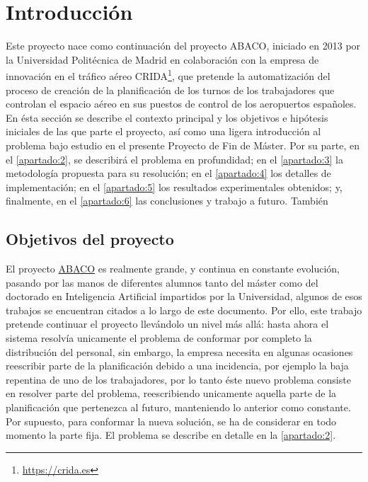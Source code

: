 \graphicspath{{capitulos/Capitulo1-Introduccion/recursos/}}


\section{Introducción}

Este proyecto nace como continuación del proyecto ABACO, iniciado en 2013 por la Universidad Politécnica de Madrid en
colaboración con la empresa de innovación en el tráfico aéreo CRIDA\footnote{\url{https://crida.es}}, que pretende la
automatización del proceso de creación de la planificación de los turnos de los trabajadores que controlan el espacio 
aéreo en sus puestos de control de los aeropuertos españoles.
\\

En ésta sección se describe el contexto principal y los objetivos e hipótesis iniciales de las que parte el proyecto, 
así como una ligera introducción al problema bajo estudio en el presente Proyecto de Fin de Máster. Por su parte, en el 
\autoref{apartado:2}, se describirá el problema en profundidad; en el \autoref{apartado:3}
la metodología propuesta para su resolución; en el \autoref{apartado:4} los detalles de implementación;
en el \autoref{apartado:5} los resultados experimentales obtenidos; y, finalmente, en el \autoref{apartado:6} las 
conclusiones y trabajo a futuro. También  %

\subsection{Objetivos del proyecto}
\label{sec:Objectivos}
El proyecto \hyperref[ABACO]{ABACO} es realmente grande, y continua en constante evolución, pasando por las manos de 
diferentes alumnos
tanto del máster como del doctorado en Inteligencia Artificial impartidos por la Universidad, algunos de esos trabajos 
se encuentran citados a lo largo de este documento. 
Por ello, este trabajo pretende continuar el proyecto llevándolo un nivel más allá: hasta ahora el sistema resolvía 
unicamente el problema de conformar por completo la distribución del personal, sin embargo, la empresa necesita en 
algunas ocasiones reescribir parte de la planificación debido a una incidencia, por ejemplo la baja repentina de uno de 
los trabajadores, por lo tanto éste nuevo problema consiste en resolver parte del problema, reescribiendo unicamente 
aquella parte de la planificación que pertenezca al futuro, manteniendo lo anterior como constante. Por supuesto, para 
conformar la nueva solución, se ha de considerar en todo momento la parte fija. El problema se describe en detalle en 
la \autoref{apartado:2}.
\\

